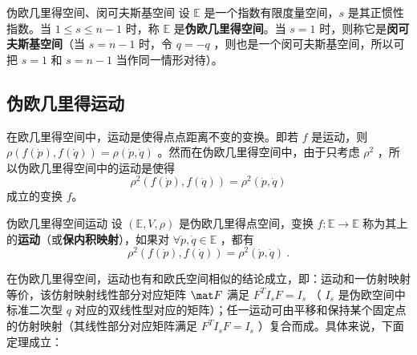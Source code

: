 \begin{definition}{伪欧几里得空间、闵可夫斯基空间}\label{EFSp_def1}
设 $\mathbb E$ 是一个指数有限度量空间，$s$ 是其正惯性指数。当 $1\leq s\leq n-1$ 时，称 $\mathbb E$ 是\textbf{伪欧几里得空间}。当 $s=1$ 时，则称它是\textbf{闵可夫斯基空间}（当 $s=n-1$ 时，令 $q=-q$ ，则也是一个闵可夫斯基空间，所以可把 $s=1$ 和 $s=n-1$ 当作同一情形对待）。
\end{definition}
\subsection{伪欧几里得运动}
在欧几里得空间中，运动是使得点点距离不变的变换。即若 $f$ 是运动，则 $\rho(f(\dot p),f(\dot q))=\rho(\dot p,\dot q)$ 。然而在伪欧几里得空间中，由于只考虑 $\rho^2$ ，所以伪欧几里得空间中的运动是使得
\begin{equation}
\rho^2(f(\dot p),f(\dot q))=\rho^2(\dot p,\dot q)
\end{equation}
成立的变换 $f$。
\begin{definition}{伪欧几里得空间运动}
设 $(\mathbb E,V,\rho)$ 是伪欧几里得点空间，变换 $f:\mathbb E\rightarrow\mathbb E$ 称为其上的\textbf{运动}（或\textbf{保内积映射}），如果对 $\forall \dot p,\dot q\in\mathbb E$ ，都有
\begin{equation}
\rho^2(f(\dot p),f(\dot q))=\rho^2(\dot p,\dot q)~.
\end{equation}
\end{definition}
在伪欧几里得空间，运动也有和欧氏空间相似的结论成立，即：运动和一仿射映射等价，该仿射映射线性部分对应矩阵 $\mat F$ 满足 $F^TI_sF=I_s$ （ $I_s$ 是伪欧空间中标准二次型 $q$ 对应的双线性型对应的矩阵）；任一运动可由平移和保持某个固定点的仿射映射（其线性部分对应矩阵满足 $F^TI_sF=I_s$ ）复合而成。具体来说，下面定理成立：
\begin{theorem}{}

\end{theorem}